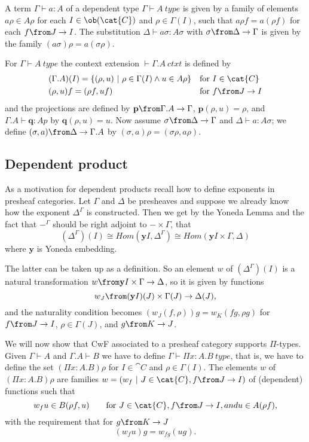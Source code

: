 A term $\Gamma \vdash a : A$ of a dependent type $\Gamma \vdash A~type$ is
given by a family of elements $a \rho \in A \rho$ for each $I \in \ob(\cat{C})$
and $\rho \in \Gamma(I)$, such that $a \rho f = a (\rho f)$ for each $f \from J
\to I$. The substitution $\Delta \vdash a \sigma : A \sigma$ with $\sigma \from
\Delta \to \Gamma$ is given by the family $(a \sigma) \rho = a (\sigma \rho)$.

For $\Gamma \vdash A~type$ the context extension $\vdash \Gamma.A~ctxt$ is
defined by
\begin{align*}
  &(\Gamma.A)(I) = \{(\rho, u)~|~\rho \in \Gamma(I) \land u \in A \rho\} &&
  \text{for $I \in \cat{C}$}\\
  &(\rho, u)f = (\rho f, u f) && \text{for $f \from J \to I$}
\end{align*}
and the projections are defined by $\mathbf{p} \from \Gamma.A \to \Gamma$,
$\mathbf{p}(\rho, u) = \rho$, and $\Gamma.A \vdash \mathbf{q} : Ap$ by
$\mathbf{q}(\rho, u) = u$.  Now assume $\sigma \from \Delta \to \Gamma$ and
$\Delta \vdash a : A\sigma$; we define $(\sigma, a) \from \Delta \to \Gamma.A$
by $(\sigma, a)\rho = (\sigma \rho, a \rho)$.

\subsection*{Dependent product}

As a motivation for dependent products recall how to define exponents in
presheaf categories. Let $\Gamma$ and $\Delta$ be presheaves and suppose we
already know how the exponent $\Delta^\Gamma$ is constructed. Then we get by
the Yoneda Lemma and the fact that $-^\Gamma$ should be right adjoint to $-
\times \Gamma$, that
\[
  (\Delta^\Gamma)(I) \cong Hom(\mathbf{y}I, \Delta^\Gamma) \cong Hom(\mathbf{y}I \times \Gamma, \Delta)
\]
where $\mathbf{y}$ is Yoneda embedding.

The latter can be taken up as a definition. So an element $w$ of
$(\Delta^\Gamma)(I)$ is a natural transformation $w \from \mathbf{y}I\times
\Gamma \to \Delta$, so it is given by functions
\[
  w_J \from (\mathbf{y}I)(J) \times \Gamma(J) \to \Delta(J),
\]
and the naturality condition becomes $(w_J(f, \rho))g = w_K(fg, \rho g)$ for $f
\from J \to I$, $\rho \in \Gamma(J)$, and $g \from K \to J$.

We will now show that CwF associated to a presheaf category supports
$\Pi$-types. Given $\Gamma \vdash A$ and $\Gamma.A \vdash B$ we have to define
$\Gamma \vdash \Pi x: A. B~type$, that is, we have to define the set $(\Pi x:
A.B) \rho$ for $I \in \cat{C}$ and $\rho \in \Gamma(I)$. The elements $w$ of
$(\Pi x:A.B)\rho$ are families $w = (w_f~|~J\in \cat{C}, f \from J \to I)$ of
(dependent) functions such that
\[
  w_f u \in B(\rho f, u) \qquad \text{for $J \in \cat{C}, f \from J \to I, and u \in A(\rho f)$},
\]
with the requirement that for $g \from K \to J$
\[
  (w_f u)g = w_{fg}(ug).
\]

